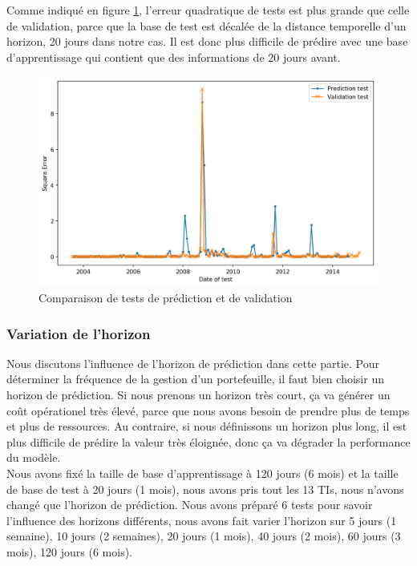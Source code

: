Comme indiqué en figure \ref{fig:test}, l'erreur quadratique de tests est plus grande que celle de validation, parce que la base de test est décalée de la distance temporelle d'un horizon, 20 jours dans notre cas. Il est donc plus difficile de prédire avec une base d'apprentissage qui contient que des informations de 20 jours avant.


\begin{figure}[H]
\centering
\includegraphics[width=.9\linewidth, scale=0.2]
{plot/VP.png}
\caption{Comparaison de tests de prédiction et de validation}
\label{fig:test}
\end{figure}

\subsubsection{Variation de l'horizon}

Nous discutons l'influence de l'horizon de prédiction dans cette partie. Pour déterminer la fréquence de la gestion d'un portefeuille, il faut bien choisir un horizon de prédiction. Si nous prenons un horizon très court, ça va générer un coût opérationel très élevé, parce que nous avons besoin de prendre plus de temps et plus de ressources. Au contraire, si nous définissons un horizon plus long, il est plus difficile de prédire la valeur très éloignée, donc ça va dégrader la performance du modèle. \\

Nous avons fixé la taille de base d'apprentissage à 120 jours (6 mois) et la taille de base de test à 20 jours (1 mois), nous avons pris tout les 13 TIs, nous n'avons changé que l'horizon de prédiction. Nous avons préparé 6 tests pour savoir l'influence des horizons différents, nous avons fait varier l'horizon sur 5 jours (1 semaine), 10 jours (2 semaines), 20 jours (1 mois), 40 jours (2 mois), 60 jours (3 mois), 120 jours (6 mois). \\

